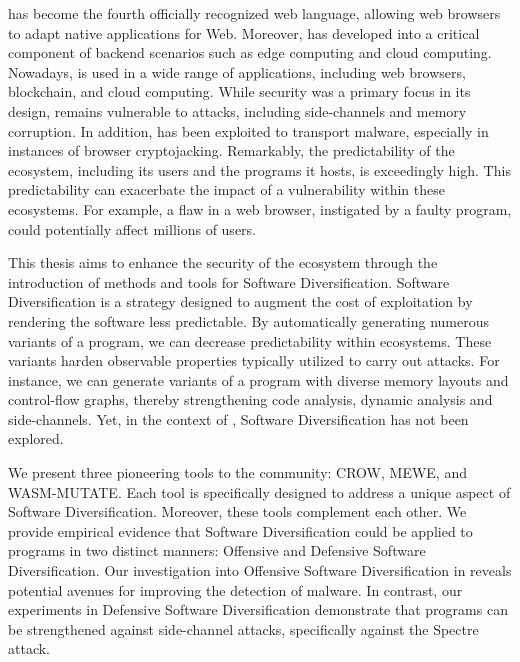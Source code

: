 
\Wasm has become the fourth officially recognized web language, allowing web browsers to adapt native applications for Web.
Moreover, \Wasm has developed into a critical component of backend scenarios such as edge computing and cloud computing.
Nowadays, \Wasm is used in a wide range of applications, including web browsers, blockchain, and cloud computing.
While security was a primary focus in its design, \Wasm remains vulnerable to attacks, including side-channels and memory corruption.
In addition, \Wasm has been exploited to transport malware, especially in instances of browser cryptojacking.
Remarkably, the predictability of the \Wasm ecosystem, including its users and the programs it hosts, is exceedingly high.
This predictability can exacerbate the impact of a vulnerability within these ecosystems.
For example, a flaw in a web browser, instigated by a faulty \Wasm program, could potentially affect millions of users.


This thesis aims to enhance the security of the \Wasm ecosystem through the introduction of methods and tools for Software Diversification.
Software Diversification is a strategy designed to augment the cost of exploitation by rendering the software less predictable.
By automatically generating numerous variants of a program, we can decrease predictability within ecosystems.
These variants harden observable properties typically utilized to carry out attacks.
For instance, we can generate variants of a program with diverse memory layouts and control-flow graphs, thereby strengthening code analysis, dynamic analysis and side-channels.
Yet, in the context of \Wasm, Software Diversification has not been explored.



We present three pioneering tools to the community: CROW, MEWE, and WASM-MUTATE. 
Each tool is specifically designed to address a unique aspect of Software Diversification. 
Moreover, these tools complement each other. 
We provide empirical evidence that Software Diversification could be applied to \Wasm programs in two distinct manners: Offensive and Defensive Software Diversification. 
Our investigation into Offensive Software Diversification in \Wasm reveals potential avenues for improving the detection of \Wasm malware. 
In contrast, our experiments in Defensive Software Diversification demonstrate that \Wasm programs can be strengthened against side-channel attacks, specifically against the Spectre attack.


